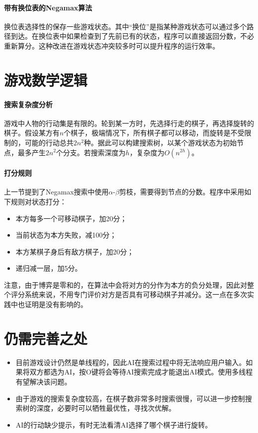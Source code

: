 \paragraph{带有换位表的Negamax算法}
换位表选择性的保存一些游戏状态。其中“换位”是指某种游戏状态可以通过多个路径到达。在换位表中如果检查到了先前已有的状态，程序可以直接返回分数，不必重新算分。这种改进在游戏状态冲突较多时可以提升程序的运行效率。

\section{游戏数学逻辑}
\paragraph{搜索复杂度分析}游戏中人物的行动集是有限的。轮到某一方时，先选择行走的棋子，再选择旋转的棋子。假设某方有$n$个棋子，极端情况下，所有棋子都可以移动，而旋转是不受限制的，可能的行动总共$2n^2$种。据此可以构建搜索树，以某个游戏状态为初始节点，最多产生$2n^2$个分支。若搜索深度为$h$，复杂度为$O(n^{2h})$。
\paragraph{打分规则}
上一节提到了Negamax搜索中使用$\alpha$-$\beta$剪枝，需要得到节点的分数。程序中采用如下规则对状态打分：
\begin{itemize}
	\item 本方每多一个可移动棋子，加20分；
	\item 当前状态为本方失败，减100分；
	\item 本方某棋子身后有敌方棋子，加20分；
	\item 递归减一层，加5分。
\end{itemize}

注意，由于博弈是零和的，在算法中会将对方的分作为本方的负分处理，因此对整个评分系统来说，不用专门评价对方是否具有可移动棋子并减分。这一点在多次实践中也证明是没有影响的。

\section{仍需完善之处}
\begin{itemize}
\item 目前游戏设计仍然是单线程的，因此AI在搜索过程中将无法响应用户输入。如果将双方都选为AI，按{\ttfamily O}键将会等待AI搜索完成才能退出AI模式。使用多线程有望解决该问题。
\item 由于游戏的搜索复杂度较高，在棋子数非常多时搜索很慢，可以进一步控制搜索树的深度，必要时可以牺牲最优性，寻找次优解。
\item AI的行动缺少提示，有时无法看清AI选择了哪个棋子进行旋转。
\end{itemize}


